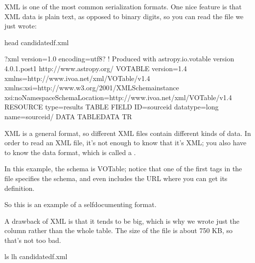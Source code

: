 \documentclass[letterpaper,10pt,english]{sphinxmanual}
\begin{document}
XML is one of the most common serialization formats.  One nice feature is that XML data is plain text, as opposed to binary digits, so you can read the file we just wrote:

\begin{sphinxVerbatim}[commandchars=\\\{\}]
head candidate\PYGZus{}df.xml
\end{sphinxVerbatim}

\begin{sphinxVerbatim}[commandchars=\\\{\}]
\PYGZlt{}?xml version=\PYGZdq{}1.0\PYGZdq{} encoding=\PYGZdq{}utf\PYGZhy{}8\PYGZdq{}?\PYGZgt{}
\PYGZlt{}!\PYGZhy{}\PYGZhy{} Produced with astropy.io.votable version 4.0.1.post1
     http://www.astropy.org/ \PYGZhy{}\PYGZhy{}\PYGZgt{}
\PYGZlt{}VOTABLE version=\PYGZdq{}1.4\PYGZdq{} xmlns=\PYGZdq{}http://www.ivoa.net/xml/VOTable/v1.4\PYGZdq{} xmlns:xsi=\PYGZdq{}http://www.w3.org/2001/XMLSchema\PYGZhy{}instance\PYGZdq{} xsi:noNamespaceSchemaLocation=\PYGZdq{}http://www.ivoa.net/xml/VOTable/v1.4\PYGZdq{}\PYGZgt{}
 \PYGZlt{}RESOURCE type=\PYGZdq{}results\PYGZdq{}\PYGZgt{}
  \PYGZlt{}TABLE\PYGZgt{}
   \PYGZlt{}FIELD ID=\PYGZdq{}source\PYGZus{}id\PYGZdq{} datatype=\PYGZdq{}long\PYGZdq{} name=\PYGZdq{}source\PYGZus{}id\PYGZdq{}/\PYGZgt{}
   \PYGZlt{}DATA\PYGZgt{}
    \PYGZlt{}TABLEDATA\PYGZgt{}
     \PYGZlt{}TR\PYGZgt{}
\end{sphinxVerbatim}

XML is a general format, so different XML files contain different kinds of data.  In order to read an XML file, it’s not enough to know that it’s XML; you also have to know the data format, which is called a .

In this example, the schema is VOTable; notice that one of the first tags in the file specifies the schema, and even includes the URL where you can get its definition.

So this is an example of a self\sphinxhyphen{}documenting format.

A drawback of XML is that it tends to be big, which is why we wrote just the  column rather than the whole table.
The size of the file is about 750 KB, so that’s not too bad.

\begin{sphinxVerbatim}[commandchars=\\\{\}]
ls \PYGZhy{}lh candidate\PYGZus{}df.xml
\end{sphinxVerbatim}
\end{document}
